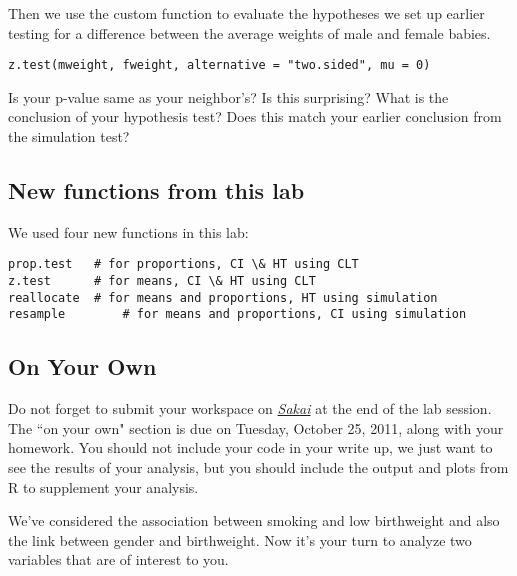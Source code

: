 \documentclass[11pt]{article}
\begin{document}
Then we use the custom function  to evaluate the hypotheses we set up earlier testing for a difference between the average weights of male and female babies.

\begin{lstlisting}
z.test(mweight, fweight, alternative = "two.sided", mu = 0)
\end{lstlisting}

\begin{exercise}
Is your p-value same as your neighbor's? Is this surprising? What is the conclusion of your hypothesis test? Does this match your earlier conclusion from the simulation test?
\end{exercise}

\subsection*{New functions from this lab}

We used four new functions in this lab:

\begin{lstlisting}
prop.test	# for proportions, CI \& HT using CLT
z.test		# for means, CI \& HT using CLT
reallocate	# for means and proportions, HT using simulation
resample		# for means and proportions, CI using simulation
\end{lstlisting}


\subsection*{On Your Own}
Do not forget to submit your workspace on \href{https://sakai.duke.edu}{\textit{Sakai}} at the end of the lab session. The ``on your own" section is due on Tuesday, October 25, 2011, along with your homework. You should not include your code in your write up, we just want to see the results of your analysis, but you should include the output and plots from R to supplement your analysis.

We've considered the association between smoking and low birthweight and also the link between gender and birthweight.  Now it's your turn to analyze two variables that are of interest to you.
\end{document}
